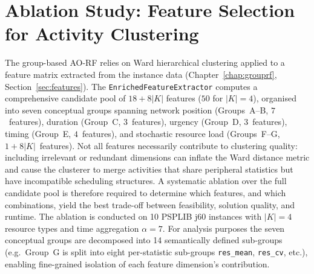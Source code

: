 \section{Ablation Study: Feature Selection for Activity Clustering}
\label{sec:ablation}
The group-based AO-RF relies on Ward hierarchical clustering
applied to a feature matrix extracted from the instance data
(Chapter~\ref{chap:grouprf}, Section~\ref{sec:features}). The
\texttt{EnrichedFeatureExtractor} computes a comprehensive
candidate pool of $18 + 8|K|$ features ($50$ for $|K|=4$),
organised into seven conceptual groups spanning network position
(Groups~A--B, $7$~features), duration (Group~C, $3$~features),
urgency (Group~D, $3$~features), timing (Group~E,
$4$~features), and stochastic resource load (Groups~F--G,
$1 + 8|K|$~features). Not all features necessarily contribute
to clustering quality: including irrelevant or redundant
dimensions can inflate the Ward distance metric and cause the
clusterer to merge activities that share peripheral statistics
but have incompatible scheduling structures. A systematic
ablation over the full candidate pool is therefore required to
determine which features, and which combinations, yield the
best trade-off between feasibility, solution quality, and
runtime.
The ablation is conducted on 10 PSPLIB j60 instances with
$|K|=4$ resource types and time aggregation $\alpha = 7$. For
analysis purposes the seven conceptual groups are decomposed
into 14 semantically defined sub-groups (e.g.\ Group~G is split
into eight per-statistic sub-groups \texttt{res\_mean},
\texttt{res\_cv}, etc.), enabling fine-grained isolation of each
feature dimension's contribution.
